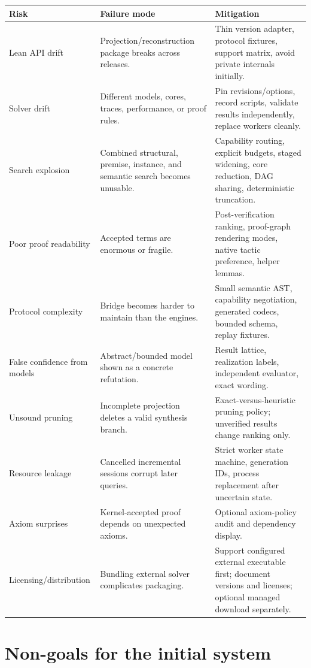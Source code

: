 \documentclass[11pt,letterpaper,openany]{report}
\newcommand{\code}[1]{\texttt{\detokenize{#1}}}
\begin{document}
\begin{longtable}{@{}L{0.22\textwidth}L{0.37\textwidth}L{0.31\textwidth}@{}}
\toprule
\textbf{Risk} & \textbf{Failure mode} & \textbf{Mitigation} \\
\midrule
\endhead
Lean API drift & Projection/reconstruction package breaks across releases. & Thin version adapter, protocol fixtures, support matrix, avoid private \code{grind} internals initially. \\
Solver drift & Different models, cores, traces, performance, or proof rules. & Pin revisions/options, record scripts, validate results independently, replace workers cleanly. \\
Search explosion & Combined structural, premise, instance, and semantic search becomes unusable. & Capability routing, explicit budgets, staged widening, core reduction, DAG sharing, deterministic truncation. \\
Poor proof readability & Accepted terms are enormous or fragile. & Post-verification ranking, proof-graph rendering modes, native tactic preference, helper lemmas. \\
Protocol complexity & Bridge becomes harder to maintain than the engines. & Small semantic AST, capability negotiation, generated codecs, bounded schema, replay fixtures. \\
False confidence from models & Abstract/bounded model shown as a concrete refutation. & Result lattice, realization labels, independent evaluator, exact wording. \\
Unsound pruning & Incomplete projection deletes a valid synthesis branch. & Exact-versus-heuristic pruning policy; unverified results change ranking only. \\
Resource leakage & Cancelled incremental sessions corrupt later queries. & Strict worker state machine, generation IDs, process replacement after uncertain state. \\
Axiom surprises & Kernel-accepted proof depends on unexpected axioms. & Optional axiom-policy audit and dependency display. \\
Licensing/distribution & Bundling external solver complicates packaging. & Support configured external executable first; document versions and licenses; optional managed download separately. \\
\bottomrule
\end{longtable}

\section{Non-goals for the initial system}
\end{document}
